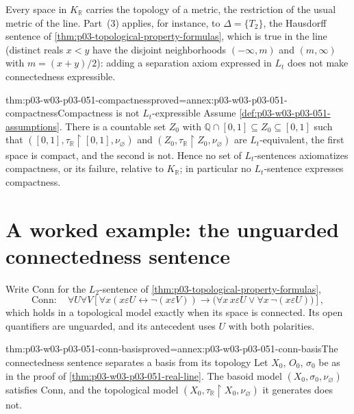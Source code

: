 Every space in \(K_{\mathbb R}\) carries the topology of a metric, the
restriction of the usual metric of the line. Part~(3) applies, for
instance, to \(\Delta=\{T_2\}\), the Hausdorff sentence of
\cref{thm:p03-topological-property-formulas}, which is true in the line
(distinct reals \(x<y\) have the disjoint neighborhoods
\((-\infty,m)\) and \((m,\infty)\) with \(m=(x+y)/2\)): adding a
separation axiom expressed in \(L_t\) does not make connectedness
expressible.

\begin{hbcorollary}{thm:p03-w03-p03-051-compactness}{proved=annex:p03-w03-p03-051-compactness}{Compactness is not \(L_t\)-expressible}
Assume \cref{def:p03-w03-p03-051-assumptions}. There is a countable set
\(Z_0\) with \(\mathbb Q\cap[0,1]\subseteq Z_0\subseteq[0,1]\) such that
\(([0,1],\tau_{\mathbb R}\restriction[0,1],\nu_\varnothing)\) and
\((Z_0,\tau_{\mathbb R}\restriction Z_0,\nu_\varnothing)\) are
\(L_t\)-equivalent, the first space is compact, and the second is not.
Hence no set of \(L_t\)-sentences axiomatizes compactness, or its failure,
relative to \(K_{\mathbb R}\); in particular no \(L_t\)-sentence expresses
compactness.
\end{hbcorollary}

\section{A worked example: the unguarded connectedness sentence}
\label{sec:p03-w03-p03-051-example}

Write \(\mathrm{Conn}\) for the \(L_2\)-sentence of
\cref{thm:p03-topological-property-formulas},
\[
 \mathrm{Conn}:\quad
 \forall U\forall V\left[
   \forall x(x\varepsilon U\leftrightarrow\neg(x\varepsilon V))
    \to\bigl(\forall x\,x\varepsilon U\lor
              \forall x\,\neg(x\varepsilon U)\bigr)\right],
\]
which holds in a topological model exactly when its space is connected.
Its open quantifiers are unguarded, and its antecedent uses \(U\) with
both polarities.

\begin{hbcorollary}{thm:p03-w03-p03-051-conn-basis}{proved=annex:p03-w03-p03-051-conn-basis}{The connectedness sentence separates a basis from its topology}
Let \(X_0\), \(O_0\), \(\sigma_0\) be as in the proof of
\cref{thm:p03-w03-p03-051-real-line}. The basoid model
\((X_0,\sigma_0,\nu_\varnothing)\) satisfies \(\mathrm{Conn}\), and the
topological model \((X_0,\tau_{\mathbb R}\restriction X_0,\nu_\varnothing)\)
it generates does not.
\end{hbcorollary}

